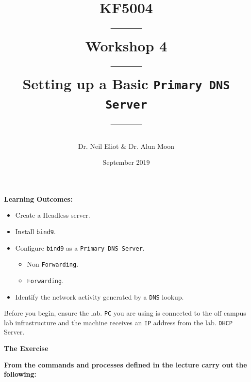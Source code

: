 \documentclass[11pt]{article}
\begin{document}
\author{Dr. Neil Eliot \& Dr. Alun Moon}
\title{KF5004\\------\\Workshop 4\\------\\Setting up a Basic \texttt{Primary DNS Server}\\------}
\date{September 2019}
\maketitle

\newpage



\noindent\textbf{Learning Outcomes:}
\begin{itemize}
    \item Create a Headless server.
    \item Install \texttt{bind9}.
    \item Configure \texttt{bind9} as a \texttt{Primary DNS Server}.
        \begin{itemize} 
            \item Non \texttt{Forwarding}.
            \item \texttt{Forwarding}.
        \end{itemize} 
    \item Identify the network activity generated by a \texttt{DNS} lookup.
\end{itemize}


\begin{tcolorbox}[title={\textbf{Important:}}]
    Before you begin, ensure the lab. \texttt{PC} you are using is connected to the off campus lab infrastructure and the machine receives an \texttt{IP} address from the lab. \texttt{DHCP} Server.
\end{tcolorbox}
\newpage

\noindent\textbf{The Exercise}\\
\begin{tcolorbox}[colback=blue!20]
    \noindent\textbf{From the commands and processes defined in the lecture carry out the following:}
\end{tcolorbox}
\end{document}
